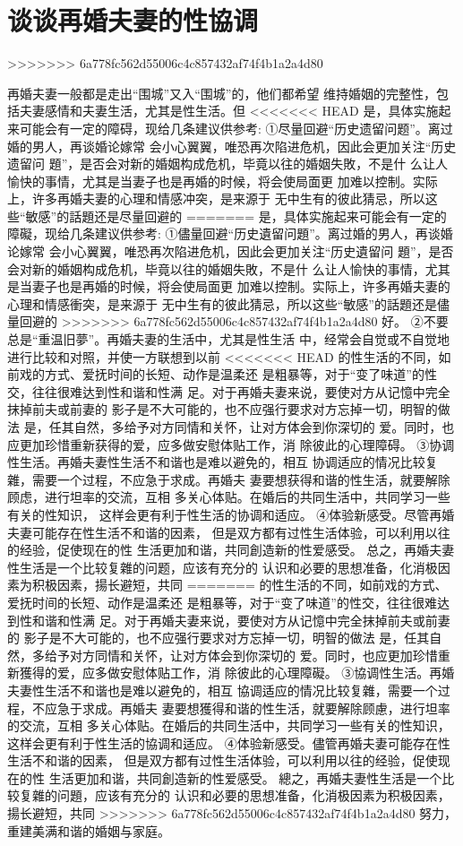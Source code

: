 \documentclass[12pt,UTF8]{ctexbook}
\begin{document}
\section{谈谈再婚夫妻的性協调}
>>>>>>> 6a778fc562d55006c4c857432af74f4b1a2a4d80

再婚夫妻一般都是走出“围城”又入“围城”的，他们都希望
维持婚姻的完整性，包括夫妻感情和夫妻生活，尤其是性生活。但
<<<<<<< HEAD
是，具体实施起来可能会有一定的障碍，现给几条建议供参考:
①尽量回避“历史遗留问题”。离过婚的男人，再谈婚论嫁常
会小心翼翼，唯恐再次陷进危机，因此会更加关注“历史遗留问
題”，是否会对新的婚姻构成危机，毕竟以往的婚姻失敗，不是什
么让人愉快的事情，尤其是当妻子也是再婚的时候，将会使局面更
加难以控制。实际上，许多再婚夫妻的心理和情感冲突，是来源于
无中生有的彼此猜忌，所以这些“敏感”的話題还是尽量回避的
=======
是，具体实施起来可能会有一定的障礙，现给几条建议供参考:
①儘量回避“历史遺留问題”。离过婚的男人，再谈婚论嫁常
会小心翼翼，唯恐再次陷进危机，因此会更加关注“历史遺留问
題”，是否会对新的婚姻构成危机，毕竟以往的婚姻失敗，不是什
么让人愉快的事情，尤其是当妻子也是再婚的时候，将会使局面更
加难以控制。实际上，许多再婚夫妻的心理和情感衝突，是来源于
无中生有的彼此猜忌，所以这些“敏感”的話題还是儘量回避的
>>>>>>> 6a778fc562d55006c4c857432af74f4b1a2a4d80
好。
②不要总是“重温旧夢”。再婚夫妻的生活中，尤其是性生活
中，经常会自觉或不自觉地进行比较和对照，并使一方联想到以前
<<<<<<< HEAD
的性生活的不同，如前戏的方式、爱抚时间的长短、动作是温柔还
是粗暴等，对于“变了味道”的性交，往往很难达到性和谐和性满
足。对于再婚夫妻来说，要使对方从记憶中完全抹掉前夫或前妻的
影子是不大可能的，也不应强行要求对方忘掉一切，明智的做法
是，任其自然，多给予对方同情和关怀，让对方体会到你深切的
爱。同时，也应更加珍惜重新获得的爱，应多做安慰体贴工作，消
除彼此的心理障碍。
③协调性生活。再婚夫妻性生活不和谐也是难以避免的，相互
协调适应的情况比较复雜，需要一个过程，不应急于求成。再婚夫
妻要想获得和谐的性生活，就要解除顾虑，进行坦率的交流，互相
多关心体贴。在婚后的共同生活中，共同学习一些有关的性知识，
这样会更有利于性生活的协调和适应。
④体验新感受。尽管再婚夫妻可能存在性生活不和谐的因素，
但是双方都有过性生活体验，可以利用以往的经验，促使现在的性
生活更加和谐，共同創造新的性爱感受。
总之，再婚夫妻性生活是一个比较复雜的问题，应该有充分的
认识和必要的思想准备，化消极因素为积极因素，揚长避短，共同
=======
的性生活的不同，如前戏的方式、爱抚时间的长短、动作是温柔还
是粗暴等，对于“变了味道”的性交，往往很难达到性和谐和性满
足。对于再婚夫妻来说，要使对方从记憶中完全抹掉前夫或前妻的
影子是不大可能的，也不应强行要求对方忘掉一切，明智的做法
是，任其自然，多给予对方同情和关怀，让对方体会到你深切的
爱。同时，也应更加珍惜重新獲得的爱，应多做安慰体贴工作，消
除彼此的心理障礙。
③協调性生活。再婚夫妻性生活不和谐也是难以避免的，相互
協调适应的情况比较复雜，需要一个过程，不应急于求成。再婚夫
妻要想獲得和谐的性生活，就要解除顾慮，进行坦率的交流，互相
多关心体贴。在婚后的共同生活中，共同学习一些有关的性知识，
这样会更有利于性生活的協调和适应。
④体验新感受。儘管再婚夫妻可能存在性生活不和谐的因素，
但是双方都有过性生活体验，可以利用以往的经验，促使现在的性
生活更加和谐，共同創造新的性爱感受。
總之，再婚夫妻性生活是一个比较复雜的问題，应该有充分的
认识和必要的思想准备，化消极因素为积极因素，揚长避短，共同
>>>>>>> 6a778fc562d55006c4c857432af74f4b1a2a4d80
努力，重建美满和谐的婚姻与家庭。
\end{document}
